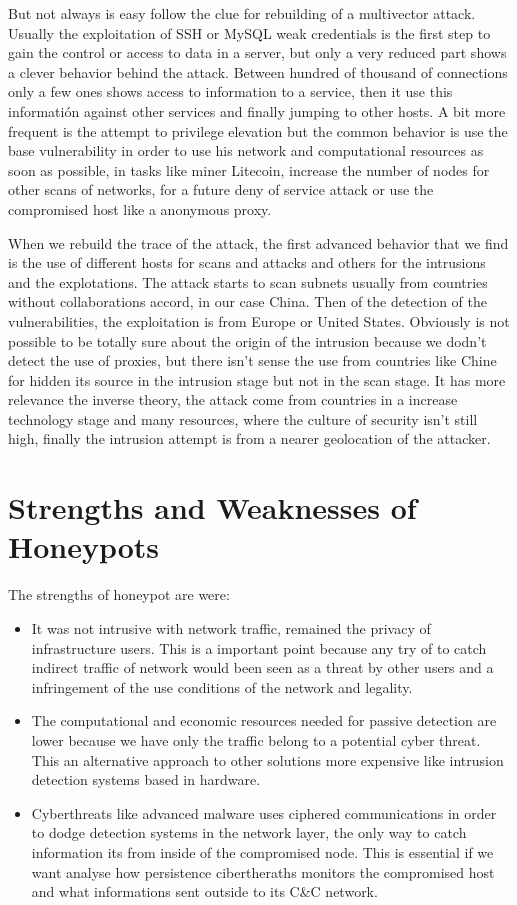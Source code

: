 \documentclass[a4paper]{llncs}
\begin{document}
But not always is easy follow the clue for rebuilding of a multivector attack. Usually the exploitation of SSH or MySQL weak credentials is the first step to gain the control or access to data in a server, but only a very reduced part shows a clever behavior behind the attack. Between hundred of thousand of connections only a few ones shows access to information to a service, then it use this informatión against other services and finally jumping to other hosts. A bit more frequent is the attempt to privilege elevation but the common behavior is use the base vulnerability in order to use his network and computational resources as soon as possible, in tasks like miner Litecoin\cite{litecoin}, increase the number of nodes for other scans of networks, for a future deny of service attack or use the compromised host like a anonymous proxy.

When we rebuild the trace of the attack, the first advanced behavior that we find is the use of different hosts for scans and attacks and others for the intrusions and the explotations. The attack starts to scan subnets usually from countries without collaborations accord, in our case China. Then of the detection of the vulnerabilities, the exploitation is from Europe or United States. Obviously is not possible to be totally sure about the origin of the intrusion because we dodn't detect the use of proxies, but there isn't sense the use from countries like Chine for hidden its source in the intrusion stage but not in the scan stage. It has more relevance the inverse theory, the attack come from countries in a increase technology stage and many resources, where the culture of security isn't still high, finally the intrusion attempt is from a nearer geolocation of the attacker.


\section{Strengths and Weaknesses of Honeypots}
The strengths of honeypot are were:
\begin{itemize}
\item It was not intrusive with network traffic, remained the privacy of infrastructure users. This is a important point because any try of to catch indirect traffic of network would been seen as a threat by other users and a infringement of the use conditions of the network and legality.
\item The computational and economic resources needed for passive detection are lower because we have only the traffic belong to a potential cyber threat. This an alternative approach to other solutions more expensive like intrusion detection systems based in hardware.
\item Cyberthreats like advanced malware uses ciphered communications in order to dodge detection systems in the network layer, the only way to catch information its from inside of the compromised node. This is essential if we want analyse how persistence cibertheraths monitors the compromised host and what informations sent outside to its C\&C network.
\end{itemize}
\end{document}
